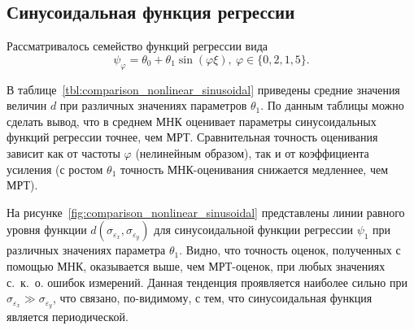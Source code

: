 \vspace{2\baselineskip}
\subsection{Синусоидальная функция регрессии}

Рассматривалось семейство функций регрессии вида
\[ \psi_{\varphi} = \theta_0 + \theta_1 \sin{(\varphi \xi)}, \:
  \varphi \in \{ 0{,}2, 1, 5 \}. \]

В таблице~\ref{tbl:comparison_nonlinear_sinusoidal} приведены средние значения
величин \( d \) при различных значениях параметров \( \theta_1 \).
По данным таблицы можно сделать вывод, что в среднем МНК оценивает параметры
синусоидальных функций регрессии точнее, чем МРТ.
Сравнительная точность оценивания зависит как от частоты \( \varphi \)
(нелинейным образом), так и от коэффициента усиления
(с ростом \( \theta_1 \) точность МНК-оценивания снижается медленнее, чем МРТ).

На рисунке~\ref{fig:comparison_nonlinear_sinusoidal}
представлены линии равного уровня функции \( d(\sigma_{\varepsilon_x}, \sigma_{\varepsilon_y}) \)
для синусоидальной функции регрессии \( \psi_{1} \) при
различных значениях параметра \( \theta_1 \).
Видно, что точность оценок, полученных с помощью МНК, оказывается выше,
чем МРТ-оценок, при любых значениях с.~к.~о. ошибок измерений.
Данная тенденция проявляется наиболее сильно при
\( \sigma_{\varepsilon_x} \gg \sigma_{\varepsilon_y} \),
что связано, по-видимому, с тем, что синусоидальная функция
является периодической.

